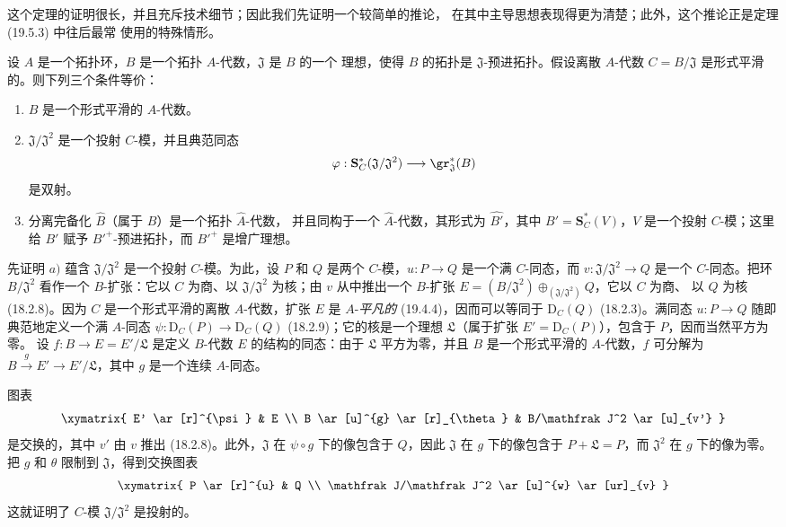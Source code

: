 这个定理的证明很长，并且充斥技术细节；因此我们先证明一个较简单的推论，
在其中主导思想表现得更为清楚；此外，这个推论正是定理 (19.5.3) 中往后最常
使用的特殊情形。

\begin{corollary}[19.5.4]
\label{0.19.5.4-fr}
设 $A$ 是一个拓扑环，$B$ 是一个拓扑 $A$-代数，$\mathfrak J$ 是 $B$ 的一个
理想，使得 $B$ 的拓扑是 $\mathfrak J$-预进拓扑。假设离散 $A$-代数
$C=B/\mathfrak J$ 是形式平滑的。则下列三个条件等价：
\begin{enumerate}
  \item[a)] $B$ 是一个形式平滑的 $A$-代数。
  \item[b)] $\mathfrak J/\mathfrak J^2$ 是一个投射 $C$-模，并且典范同态
  \[
    \varphi:\mathbf S_C^*(\mathfrak J/\mathfrak J^2)
    \longrightarrow\gr_{\mathfrak J}^*(B)
  \]
  是双射。
  \item[c)] 分离完备化 $\widehat B$（属于 $B$）是一个拓扑 $\widehat A$-代数，
  并且同构于一个 $\widehat A$-代数，其形式为 $\widehat{B'}$，其中
  $B'=\mathbf S_C^*(V)$，$V$ 是一个投射 $C$-模；这里给 $B'$ 赋予
  ${B'}^+$-预进拓扑，而 ${B'}^+$ 是增广理想。
\end{enumerate}
\end{corollary}

\begin{env}[19.5.4.1]
\label{0.19.5.4.1-fr}
先证明 $a)$ 蕴含 $\mathfrak J/\mathfrak J^2$ 是一个投射 $C$-模。为此，设
$P$ 和 $Q$ 是两个 $C$-模，$u:P\to Q$ 是一个满 $C$-同态，而
$v:\mathfrak J/\mathfrak J^2\to Q$ 是一个 $C$-同态。把环
$B/\mathfrak J^2$ 看作一个 $B$-扩张：它以 $C$ 为商、以
$\mathfrak J/\mathfrak J^2$ 为核；由 $v$ 从中推出一个 $B$-扩张
$E=(B/\mathfrak J^2)\oplus_{(\mathfrak J/\mathfrak J^2)}Q$，它以 $C$ 为商、
以 $Q$ 为核 (18.2.8)。因为
$C$ 是一个形式平滑的离散 $A$-代数，扩张 $E$ 是 $A$-\emph{平凡的}
(19.4.4)，因而可以等同于 $\mathrm D_C(Q)$ (18.2.3)。满同态
$u:P\to Q$ 随即典范地定义一个满 $A$-同态
$\psi:\mathrm D_C(P)\to\mathrm D_C(Q)$ (18.2.9)；它的核是一个理想
$\mathfrak L$（属于扩张 $E'=\mathrm D_C(P)$），包含于 $P$，因而当然平方为零。
设 $f:B\to E=E'/\mathfrak L$ 是定义 $B$-代数 $E$ 的结构的同态：由于
$\mathfrak L$ 平方为零，并且 $B$ 是一个形式平滑的 $A$-代数，$f$ 可分解为
$B\xrightarrow{g}E'\to E'/\mathfrak L$，其中 $g$ 是一个连续 $A$-同态。


图表
\[
  \xymatrix{
    E' \ar[r]^{\psi} & E \\
    B \ar[u]^{g} \ar[r]_{\theta} & B/\mathfrak J^2 \ar[u]_{v'}
  }
\]
是交换的，其中 $v'$ 由 $v$ 推出 (18.2.8)。此外，$\mathfrak J$ 在
$\psi\circ g$ 下的像包含于 $Q$，因此 $\mathfrak J$ 在 $g$ 下的像包含于
$P+\mathfrak L=P$，而 $\mathfrak J^2$ 在 $g$ 下的像为零。把 $g$ 和
$\theta$ 限制到 $\mathfrak J$，得到交换图表
\[
  \xymatrix{
    P \ar[r]^{u} & Q \\
    \mathfrak J/\mathfrak J^2 \ar[u]^{w} \ar[ur]_{v}
  }
\]
这就证明了 $C$-模 $\mathfrak J/\mathfrak J^2$ 是投射的。
\end{env}

